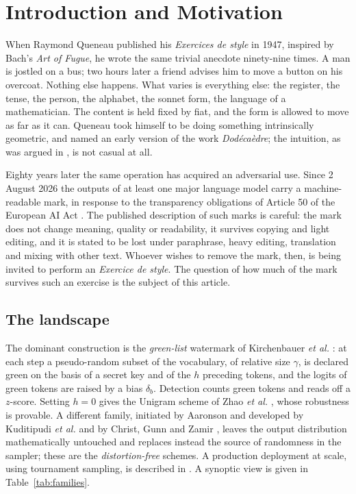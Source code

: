 \documentclass[11pt,a4paper]{article}
\theoremstyle{plain}
\theoremstyle{definition}
\numberwithin{equation}{section}
\begin{document}
\section{Introduction and Motivation}

When Raymond Queneau published his \emph{Exercices de style} in 1947,
inspired by Bach's \emph{Art of Fugue}, he wrote the same trivial
anecdote ninety-nine times. A man is jostled on a bus; two hours later a
friend advises him to move a button on his overcoat. Nothing else
happens. What varies is everything else: the register, the tense, the
person, the alphabet, the sonnet form, the language of a
mathematician. The content is held fixed by fiat, and the form is
allowed to move as far as it can. Queneau took himself to be doing
something intrinsically geometric, and named an early version of the
work \emph{Dod\'eca\`edre}; the intuition, as was argued in \cite{CM25},
is not casual at all.

Eighty years later the same operation has acquired an adversarial use.
Since 2 August 2026 the outputs of at least one major language model
carry a machine-readable mark, in response to the transparency
obligations of Article 50 of the European AI Act \cite{Anthropic26}. The
published description of such marks is careful: the mark does not change
meaning, quality or readability, it survives copying and light editing,
and it is stated to be lost under paraphrase, heavy editing, translation
and mixing with other text. Whoever wishes to remove the mark, then, is
being invited to perform an \emph{Exercice de style}. The question of
how much of the mark survives such an exercise is the subject of this
article.

\subsection*{The landscape}

The dominant construction is the \emph{green-list} watermark of
Kirchenbauer \emph{et al.} \cite{KGW23}: at each step a
pseudo-random subset of the vocabulary, of relative size $\gamma$, is
declared green on the basis of a secret key and of the $h$ preceding
tokens, and the logits of green tokens are raised by a bias $\delta_b$.
Detection counts green tokens and reads off a $z$-score. Setting $h=0$
gives the Unigram scheme of Zhao \emph{et al.} \cite{Zhao24}, whose
robustness is provable. A different family, initiated by Aaronson and
developed by Kuditipudi \emph{et al.} \cite{Kud24} and by Christ, Gunn
and Zamir \cite{CGZ24}, leaves the output distribution mathematically
untouched and replaces instead the source of randomness in the sampler;
these are the \emph{distortion-free} schemes. A production deployment at
scale, using tournament sampling, is described in \cite{Dath24}. A
synoptic view is given in Table~\ref{tab:families}.
\end{document}
